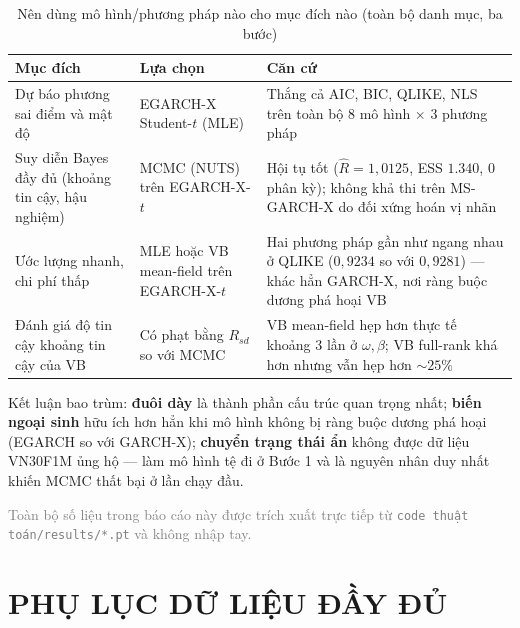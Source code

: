 \documentclass[11pt,a4paper]{article}
\begin{document}
\begin{table}[H]\centering
\caption{Nên dùng mô hình/phương pháp nào cho mục đích nào (toàn bộ danh mục, ba bước)}
\begin{threeparttable}
\begin{tabularx}{\textwidth}{>{\raggedright\arraybackslash}p{4.0cm} >{\centering\arraybackslash}p{3.4cm} X}
\toprule
\textbf{Mục đích} & \textbf{Lựa chọn} & \textbf{Căn cứ} \\
\midrule
Dự báo phương sai điểm và mật độ & EGARCH-X Student-$t$ (MLE) & Thắng cả AIC, BIC, QLIKE, NLS trên toàn bộ 8 mô hình $\times$ 3 phương pháp \\
Suy diễn Bayes đầy đủ (khoảng tin cậy, hậu nghiệm) & MCMC (NUTS) trên EGARCH-X-$t$ & Hội tụ tốt ($\hat R=1{,}0125$, ESS $1.340$, $0$ phân kỳ); không khả thi trên MS-GARCH-X do đối xứng hoán vị nhãn \\
Ước lượng nhanh, chi phí thấp & MLE hoặc VB mean-field trên EGARCH-X-$t$ & Hai phương pháp gần như ngang nhau ở QLIKE ($0{,}9234$ so với $0{,}9281$) --- khác hẳn GARCH-X, nơi ràng buộc dương phá hoại VB \\
Đánh giá độ tin cậy khoảng tin cậy của VB & Có phạt bằng $R_{sd}$ so với MCMC & VB mean-field hẹp hơn thực tế khoảng $3$ lần ở $\omega,\beta$; VB full-rank khá hơn nhưng vẫn hẹp hơn $\sim\!25\%$ \\
\bottomrule
\end{tabularx}
\begin{tablenotes}\small
\item Kết luận bao trùm: \textbf{đuôi dày} là thành phần cấu trúc quan trọng nhất; \textbf{biến ngoại sinh} hữu ích hơn hẳn khi mô hình không bị ràng buộc dương phá hoại (EGARCH so với GARCH-X); \textbf{chuyển trạng thái ẩn} không được dữ liệu VN30F1M ủng hộ --- làm mô hình tệ đi ở Bước 1 và là nguyên nhân duy nhất khiến MCMC thất bại ở lần chạy đầu.
\end{tablenotes}
\end{threeparttable}
\end{table}

\vfill
\begin{center}\small\textcolor{gray}{%
Toàn bộ số liệu trong báo cáo này được trích xuất trực tiếp từ
\texttt{code thuật toán/results/*.pt} và không nhập tay.}
\end{center}

\clearpage
\appendix
\section*{\centering PHỤ LỤC DỮ LIỆU ĐẦY ĐỦ}
\end{document}
